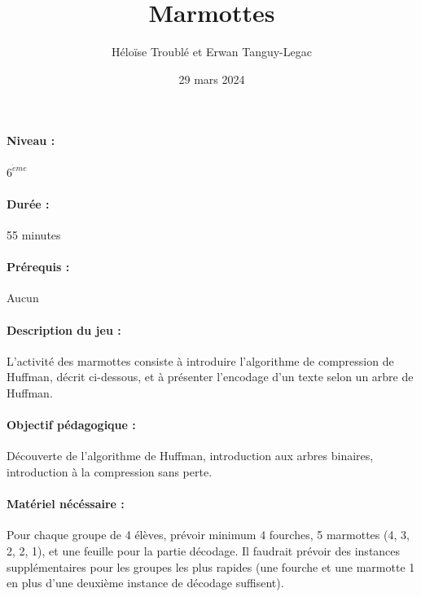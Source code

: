 \documentclass[12pt, a4paper]{article}
\begin{document}
	
	\title{Marmottes}
	\author{Héloïse Troublé et Erwan Tanguy-Legac}
	\date{29 mars 2024}
	\maketitle
	
	\paragraph*{Niveau :} $6^{\grave{e}me}$
	\paragraph*{Durée :} 55 minutes
	\paragraph*{Prérequis :} Aucun
	\paragraph*{Description du jeu :}
  L'activité des marmottes consiste à introduire l'algorithme de compression de Huffman, décrit ci-dessous, et à présenter l'encodage
  d'un texte selon un arbre de Huffman.
	
	\paragraph*{Objectif pédagogique :}
  Découverte de l'algorithme de Huffman, introduction aux arbres binaires, introduction à la compression sans perte.

  \paragraph*{Matériel nécéssaire :}
  Pour chaque groupe de 4 élèves, prévoir minimum 4 fourches, 5 marmottes (4, 3, 2, 2, 1), et une feuille pour la partie décodage.
  Il faudrait prévoir des instances supplémentaires pour les groupes les plus rapides (une fourche et une marmotte 1 en plus d'une deuxième
  instance de décodage suffisent).
	
\end{document}
